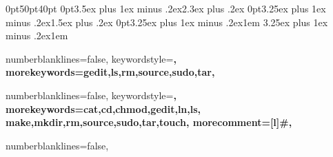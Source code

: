 \titlespacing*{\chapter} {0pt}{50pt}{40pt}
\titlespacing*{\section} {0pt}{3.5ex plus 1ex minus .2ex}{2.3ex plus .2ex}
\titlespacing*{\subsection} {0pt}{3.25ex plus 1ex minus .2ex}{1.5ex plus .2ex}
\titlespacing*{\paragraph} {0pt}{3.25ex plus 1ex minus .2ex}{1em}
\titlespacing*{\subparagraph} {\parindent}{3.25ex plus 1ex minus .2ex}{1em}

\titleformat{\section}{\Large \bf \nimbus}{\thesection}{1em}{}
\titleformat{\subsection}{\large \bf \nimbus}{\thesubsection}{0.5em}{}

\setlength{\parskip}{0.5\baselineskip}
\setlength{\abovedisplayskip}{1pt}
\setlength{\belowdisplayskip}{1pt}

\usetikzlibrary{arrows,positioning}
\newcommand\nbvspace[1][3]{\vspace*{\stretch{#1}}}
\newcommand\nbstretchyspace{\spaceskip0.5em plus 0.25em minus 0.25em}
\newcommand{\nbtitlestretch}{\spaceskip0.6em}

\pagestyle{fancy}



 {
  numberblanklines=false,
  keywordstyle=\color{blue}\bfseries,
  morekeywords={gedit,ls,rm,source,sudo,tar},
}

 {
  numberblanklines=false,
  keywordstyle=\color{blue}\bfseries,
  morekeywords={cat,cd,chmod,gedit,ln,ls,
    make,mkdir,rm,source,sudo,tar,touch},
  morecomment=[l]{\#},
}

 {
  numberblanklines=false,
}


